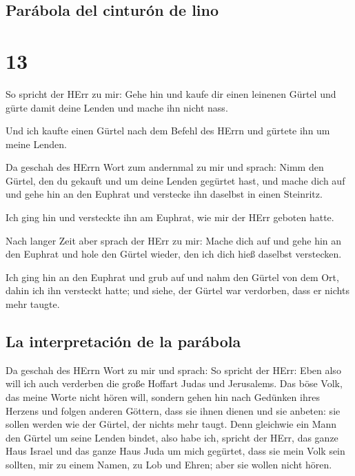 \hypertarget{paruxe1bola-del-cinturuxf3n-de-lino}{%
\subsection{Parábola del cinturón de
lino}\label{paruxe1bola-del-cinturuxf3n-de-lino}}

\hypertarget{section-12}{%
\section{13}\label{section-12}}

 So spricht der HErr zu mir: Gehe hin und kaufe dir einen
leinenen Gürtel und gürte damit deine Lenden und mache ihn nicht nass.

 Und ich kaufte einen Gürtel nach dem Befehl des HErrn und
gürtete ihn um meine Lenden.

 Da geschah des HErrn Wort zum andernmal zu mir und
sprach:  Nimm den Gürtel, den du gekauft und um deine
Lenden gegürtet hast, und mache dich auf und gehe hin an den Euphrat und
verstecke ihn daselbst in einen Steinritz.

 Ich ging hin und versteckte ihn am Euphrat, wie mir der
HErr geboten hatte.

 Nach langer Zeit aber sprach der HErr zu mir: Mache dich
auf und gehe hin an den Euphrat und hole den Gürtel wieder, den ich dich
hieß daselbst verstecken.

 Ich ging hin an den Euphrat und grub auf und nahm den
Gürtel von dem Ort, dahin ich ihn versteckt hatte; und siehe, der Gürtel
war verdorben, dass er nichts mehr taugte.

\hypertarget{la-interpretaciuxf3n-de-la-paruxe1bola}{%
\subsection{La interpretación de la
parábola}\label{la-interpretaciuxf3n-de-la-paruxe1bola}}

 Da geschah des HErrn Wort zu mir und sprach:
 So spricht der HErr: Eben also will ich auch verderben
die große Hoffart Judas und Jerusalems.  Das böse Volk,
das meine Worte nicht hören will, sondern gehen hin nach Gedünken ihres
Herzens und folgen anderen Göttern, dass sie ihnen dienen und sie
anbeten: sie sollen werden wie der Gürtel, der nichts mehr taugt.
 Denn gleichwie ein Mann den Gürtel um seine Lenden
bindet, also habe ich, spricht der HErr, das ganze Haus Israel und das
ganze Haus Juda um mich gegürtet, dass sie mein Volk sein sollten, mir
zu einem Namen, zu Lob und Ehren; aber sie wollen nicht hören.

